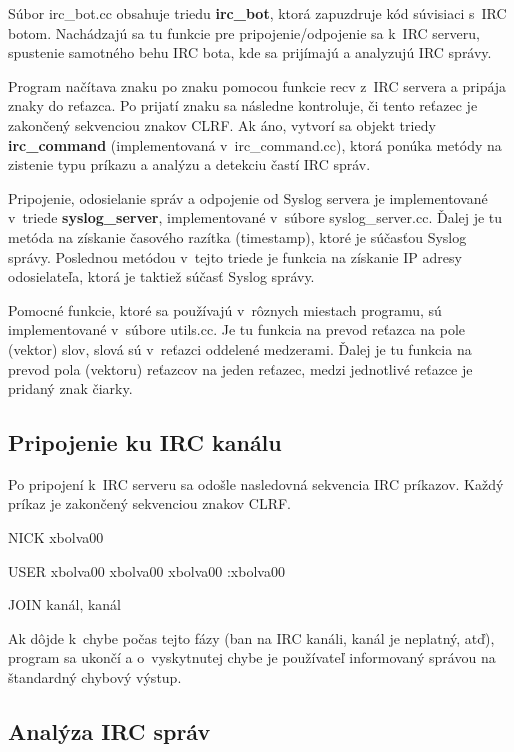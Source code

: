 Súbor irc\_bot.cc obsahuje triedu \textbf{irc\_bot}, ktorá zapuzdruje kód súvisiaci s~IRC botom. Nachádzajú sa tu funkcie pre pripojenie/odpojenie sa k~IRC serveru, spustenie samotného behu IRC bota, kde sa prijímajú a analyzujú IRC správy.

Program načítava znaku po znaku pomocou funkcie recv z~IRC servera a pripája znaky do reťazca. Po prijatí znaku sa následne kontroluje, či tento reťazec je zakončený sekvenciou znakov CLRF. Ak áno, vytvorí sa objekt triedy \textbf{irc\_command} (implementovaná v~irc\_command.cc), ktorá ponúka metódy na zistenie typu príkazu a analýzu a detekciu častí IRC správ.

Pripojenie, odosielanie správ a odpojenie od Syslog servera je implementované v~triede \textbf{syslog\_server}, implementované v~súbore syslog\_server.cc. Ďalej je tu metóda na získanie časového razítka (timestamp), ktoré je súčasťou Syslog správy. Poslednou metódou v~tejto triede je funkcia na získanie IP adresy odosielateľa, ktorá je taktiež súčasť Syslog správy.

Pomocné funkcie, ktoré sa používajú v~rôznych miestach programu, sú implementované v~súbore utils.cc. Je tu funkcia na prevod reťazca na pole (vektor) slov, slová sú v~reťazci oddelené medzerami. Ďalej je tu funkcia na prevod pola (vektoru) reťazcov na jeden reťazec, medzi jednotlivé reťazce je pridaný znak čiarky. 

\newpage

\subsection{Pripojenie ku IRC kanálu}
Po pripojení k~IRC serveru sa odošle nasledovná sekvencia IRC príkazov. Každý príkaz je zakončený sekvenciou znakov CLRF.
\begin{framed}
	NICK xbolva00
	
	USER xbolva00 xbolva00 xbolva00 :xbolva00
	
	JOIN kanál{, kanál}
\end{framed}

Ak dôjde k~chybe počas tejto fázy (ban na IRC kanáli, kanál je neplatný, atď), program sa ukončí a o~vyskytnutej chybe je používateľ informovaný správou na štandardný chybový výstup.

\newpage

\subsection{Analýza IRC správ}

